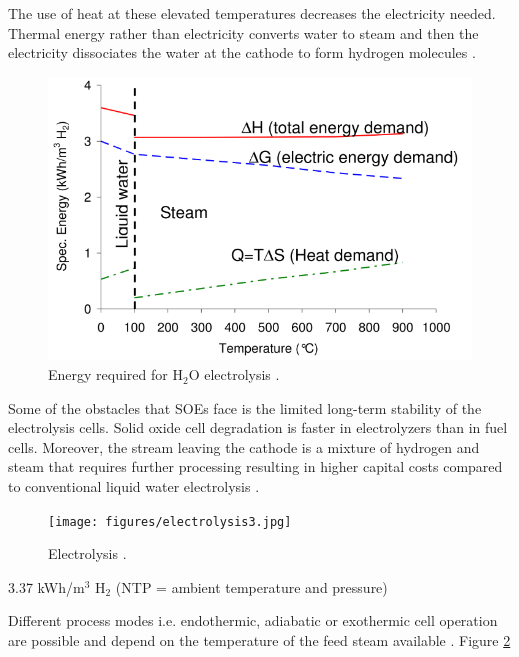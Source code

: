 \documentclass[11pt,letterpaper]{article}
\begin{document}
The use of heat at these elevated temperatures decreases the electricity needed.
Thermal energy rather than electricity converts water to steam and then the electricity dissociates the water at the cathode to form hydrogen molecules \cite{xu_introduction_2017}.

\begin{figure}[] %
	\centering
	\includegraphics[width=0.6\linewidth]{figures/electrolysis2.png}
	\hfill
	\caption{Energy required for H$_2$O electrolysis \cite{helmeth_high_2020}.}
	\label{fig:nf2}
\end{figure}


Some of the obstacles that \glspl{SOE} face is the limited long-term stability of the electrolysis cells. Solid oxide cell degradation is faster in electrolyzers than in fuel cells. Moreover, the stream leaving the cathode is a mixture of hydrogen and steam that requires further processing resulting in higher capital costs compared to conventional liquid water electrolysis \cite{ursua_hydrogen_2012}.

\begin{figure}[] %
	\centering
	\texttt{[image: figures/electrolysis3.jpg]}
	\hfill
	\caption{ Electrolysis \cite{doenitz_concepts_1982}.}
	\label{fig:electro3}
\end{figure}

3.37 kWh/m$^3$ H$_2$ (NTP = ambient temperature and pressure)
\cite{helmeth_high_2020}

Different process modes i.e. endothermic, adiabatic or exothermic cell operation are possible and depend on the temperature of the feed steam available \cite{doenitz_concepts_1982}. Figure \ref{fig:electro3}
\end{document}

